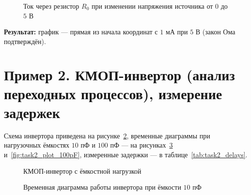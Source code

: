 \documentclass[12pt,a4paper]{article}
\theoremstyle{plain}
\theoremstyle{definition}
\theoremstyle{remark}
\numberwithin{equation}{section}
\begin{document}
\begin{figure}[H]
    \centering
    \caption{Ток через резистор $R_0$ при изменении напряжения источника от $0$ до $5$ В}
    \label{fig:task1_plot}
\end{figure}

\textbf{Результат:} график — прямая из начала координат с $1$ мА при $5$ В (закон Ома подтверждён).

\section{Пример 2. КМОП-инвертор (анализ переходных процессов), измерение задержек}

Схема инвертора приведена на рисунке~\ref{fig:task2_circuit}, 
временные диаграммы при нагрузочных ёмкостях $10$ пФ и $100$ пФ — 
на рисунках~\ref{fig:task2_plot_10pF} и~\ref{fig:task2_plot_100pF}, 
измеренные задержки — в таблице~\ref{tab:task2_delays}.

\begin{figure}[H]
    \centering
    \caption{КМОП-инвертор с ёмкостной нагрузкой}
    \label{fig:task2_circuit}
\end{figure}

\begin{figure}[H]
    \centering
    \caption{Временная диаграмма работы инвертора при ёмкости $10$ пФ}
    \label{fig:task2_plot_10pF}
\end{figure}
\end{document}
